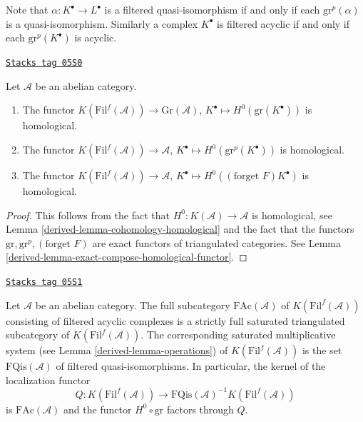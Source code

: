 Note that $\alpha : K^\bullet \to L^\bullet$ is a filtered quasi-isomorphism
if and only if each $\text{gr}^p(\alpha)$ is a quasi-isomorphism. Similarly
a complex $K^\bullet$ is filtered acyclic if and only if each
$\text{gr}^p(K^\bullet)$ is acyclic.

\begin{lemma}
\label{derived-lemma-filtered-cohomology-homological}
\href{https://stacks.math.columbia.edu/tag/05S0}{\texttt{Stacks tag 05S0}}

Let $\mathcal{A}$ be an abelian category.
\begin{enumerate}
\item The functor
$K(\text{Fil}^f(\mathcal{A})) \longrightarrow \text{Gr}(\mathcal{A})$,
$K^\bullet \longmapsto H^0(\text{gr}(K^\bullet))$
is homological.
\item The functor
$K(\text{Fil}^f(\mathcal{A})) \rightarrow \mathcal{A}$,
$K^\bullet \longmapsto H^0(\text{gr}^p(K^\bullet))$
is homological.
\item The functor
$K(\text{Fil}^f(\mathcal{A})) \longrightarrow \mathcal{A}$,
$K^\bullet \longmapsto H^0((\text{forget }F)K^\bullet)$
is homological.
\end{enumerate}
\end{lemma}

\begin{proof}

This follows from the fact that
$H^0 : K(\mathcal{A}) \to \mathcal{A}$ is homological, see
Lemma \ref{derived-lemma-cohomology-homological}
and the fact that the functors $\text{gr}, \text{gr}^p, (\text{forget }F)$
are exact functors of triangulated categories. See
Lemma \ref{derived-lemma-exact-compose-homological-functor}.
\end{proof}

\begin{lemma}
\label{derived-lemma-filtered-acyclic}
\href{https://stacks.math.columbia.edu/tag/05S1}{\texttt{Stacks tag 05S1}}

Let $\mathcal{A}$ be an abelian category. The full subcategory
$\text{FAc}(\mathcal{A})$ of $K(\text{Fil}^f(\mathcal{A}))$
consisting of filtered acyclic complexes is a strictly full saturated
triangulated subcategory of $K(\text{Fil}^f(\mathcal{A}))$.
The corresponding saturated multiplicative system (see
Lemma \ref{derived-lemma-operations})
of $K(\text{Fil}^f(\mathcal{A}))$ is the set
$\text{FQis}(\mathcal{A})$ of filtered quasi-isomorphisms.
In particular, the kernel of the localization
functor
$$
Q :
K(\text{Fil}^f(\mathcal{A}))
\longrightarrow
\text{FQis}(\mathcal{A})^{-1}K(\text{Fil}^f(\mathcal{A}))
$$
is $\text{FAc}(\mathcal{A})$ and the functor $H^0 \circ \text{gr}$
factors through $Q$.
\end{lemma}


